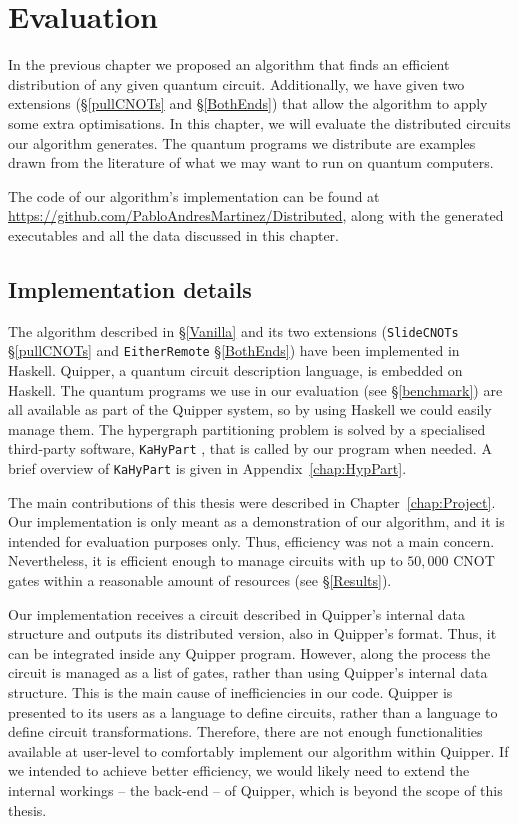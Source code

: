 \chapter{Evaluation}

In the previous chapter we proposed an algorithm that finds an efficient distribution of any given quantum circuit. Additionally, we have given two extensions (\S\ref{pullCNOTs} and \S\ref{BothEnds}) that allow the algorithm to apply some extra optimisations. In this chapter, we will evaluate the distributed circuits our algorithm generates. The quantum programs we distribute are examples drawn from the literature of what we may want to run on quantum computers.

The code of our algorithm's implementation can be found at {\small \url{https://github.com/PabloAndresMartinez/Distributed}}, along with the generated executables and all the data discussed in this chapter. 


\section{Implementation details}
\label{implementation}

The algorithm described in \S\ref{Vanilla} and its two extensions (\texttt{SlideCNOTs} \S\ref{pullCNOTs} and \texttt{EitherRemote} \S\ref{BothEnds}) have been implemented in Haskell. Quipper, a quantum circuit description language, is embedded on Haskell. The quantum programs we use in our evaluation (see \S\ref{benchmark}) are all available as part of the Quipper system, so by using Haskell we could easily manage them. The hypergraph partitioning problem is solved by a specialised third-party software, \texttt{KaHyPart} \citep{KaHyPart}, that is called by our program when needed. A brief overview of \texttt{KaHyPart} is given in Appendix~\ref{chap:HypPart}. 

The main contributions of this thesis were described in Chapter~\ref{chap:Project}. Our implementation is only meant as a demonstration of our algorithm, and it is intended for evaluation purposes only. Thus, efficiency was not a main concern. Nevertheless, it is efficient enough to manage circuits with up to \(50,000\) CNOT gates within a reasonable amount of resources (see \S\ref{Results}).

Our implementation receives a circuit described in Quipper's internal data structure and outputs its distributed version, also in Quipper's format. Thus, it can be integrated inside any Quipper program. However, along the process the circuit is managed as a list of gates, rather than using Quipper's internal data structure. This is the main cause of inefficiencies in our code. Quipper is presented to its users as a language to define circuits, rather than a language to define circuit transformations. Therefore, there are not enough functionalities available at user-level to comfortably implement our algorithm within Quipper. If we intended to achieve better efficiency, we would likely need to extend the internal workings -- the back-end -- of Quipper, which is beyond the scope of this thesis.

